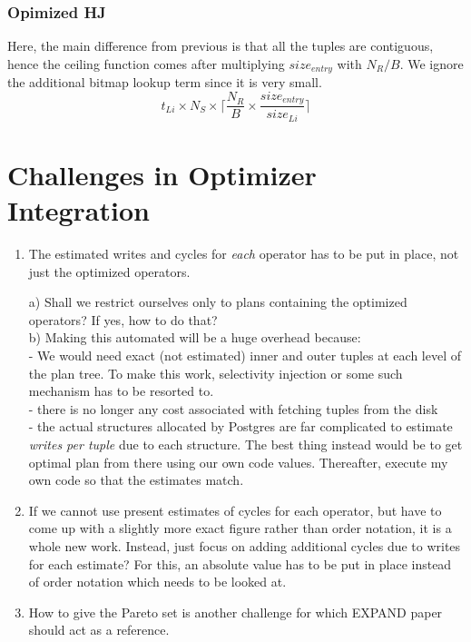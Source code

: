 \documentclass[10pt]{article}
\begin{document}
\subsubsection{Opimized HJ}
Here, the main difference from previous is that all the tuples are contiguous, hence the ceiling function comes after multiplying $size_{entry}$ with $N_R/B$. We ignore the additional bitmap lookup term since it is very small.
\begin{equation}
t_{Li} \times N_S\times \lceil\frac{N_R}{B} \times  \frac {size_{entry}}{size_{Li}} \rceil
\end{equation}

\section{Challenges in Optimizer Integration}
\begin{enumerate}
\item The estimated writes and cycles for \emph{each} operator has to be put in place, not just the optimized operators.

a) Shall we restrict ourselves only to plans containing the optimized operators? If yes, how to do that?\\
b) Making this automated will be a huge overhead because:\\
- We would need exact (not estimated) inner and outer tuples at each level of the plan tree. To make this work, selectivity injection or some such mechanism has to be resorted to.\\
- there is no longer any cost associated with fetching tuples from the disk\\
- the actual structures allocated by Postgres are far complicated to estimate \emph{writes per tuple} due to each structure. The best thing instead would be to get optimal plan from there using our own code values. Thereafter, execute my own code so that the estimates match.


\item If we cannot use present estimates of cycles for each operator, but have to come up with a slightly more exact figure rather than order notation, it is a whole new work. Instead, just focus on adding additional cycles due to writes for each estimate? For this, an absolute value has to be put in place instead of order notation which needs to be looked at.

\item How to give the Pareto set is another challenge for which EXPAND paper should act as a reference.


\end{enumerate}
\end{document}
